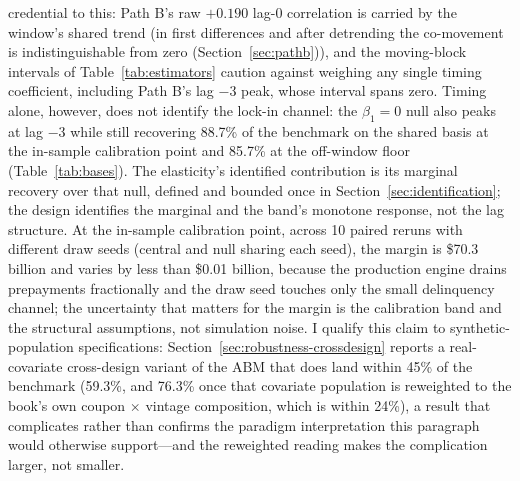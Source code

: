 \documentclass[12pt]{article}
\begin{document}
credential to this: Path B's raw $+0.190$ lag-0 correlation is carried by the window's shared trend (in first differences and after detrending the co-movement is indistinguishable from zero (Section~\ref{sec:pathb})), and the moving-block intervals of Table~\ref{tab:estimators} caution against weighing any single timing coefficient, including Path B's lag $-3$ peak, whose interval spans zero. Timing alone, however, does not identify the lock-in channel: the $\beta_1 = 0$ null also peaks at lag $-3$ while still recovering 88.7\% of the benchmark on the shared basis at the in-sample calibration point and 85.7\% at the off-window floor (Table~\ref{tab:bases}). The elasticity's identified contribution is its marginal recovery over that null, defined and bounded once in Section~\ref{sec:identification}; the design identifies the marginal and the band's monotone response, not the lag structure. At the in-sample calibration point, across 10 paired reruns with different draw seeds (central and null sharing each seed), the margin is \$70.3 billion and varies by less than \$0.01 billion, because the production engine drains prepayments fractionally and the draw seed touches only the small delinquency channel; the uncertainty that matters for the margin is the calibration band and the structural assumptions, not simulation noise. I qualify this claim to synthetic-population specifications: Section~\ref{sec:robustness-crossdesign} reports a real-covariate cross-design variant of the ABM that does land within 45\% of the benchmark (59.3\%, and 76.3\% once that covariate population is reweighted to the book's own coupon $\times$ vintage composition, which is within 24\%), a result that complicates rather than confirms the paradigm interpretation this paragraph would otherwise support---and the reweighted reading makes the complication larger, not smaller.
\end{document}
